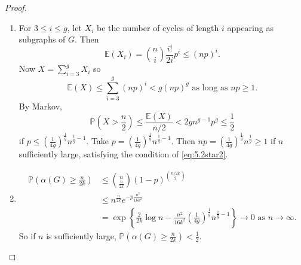 \documentclass{article}
\begin{document}
\begin{proof}
    \begin{enumerate}
        \item For $3 \leq i \leq g$, let $X_i$ be the number of cycles of length $i$ appearing as subgraphs of $G$.
            Then
            \begin{equation*}
                \mathbb{E}(X_i) = \binom{n}{i} \frac{i!}{2i} p^i \leq (np)^i.
            \end{equation*}
            Now $X = \sum_{i=3}^g X_i$ so
            \begin{equation*}
                \mathbb{E}(X) \leq \sum_{i=3}^g (np)^i < g (np)^g \text{ as long as } np \geq 1. \label{eq:5.2star2}\tag{$*$}
            \end{equation*}
            By Markov,
            \begin{equation*}
                \mathbb{P}\left(X > \frac{n}{2}\right) \leq \frac{\mathbb{E}(X)}{n/2} < 2g n^{g-1} p^g \leq \frac{1}{2}
            \end{equation*}
            if $p \leq (\frac{1}{4g})^{\frac{1}{g}} n^{\frac{1}{g}-1}$.
            Take $p = (\frac{1}{4g})^{\frac{1}{g}} n^{\frac{1}{g}-1}$.
            Then $np = \left(\frac{1}{4g}\right)^\frac{1}{g} n^{\frac{1}{g}} \geq 1$ if $n$ sufficiently large, satisfying the condition of \eqref{eq:5.2star2}.
        \item \begin{align*}
                \mathbb{P}\left(\alpha(G) \geq \frac{n}{2k}\right) &\leq \binom{n}{\frac{n}{2k}} (1-p)^{\binom{n/2k}{2}} \\
                                                        &\leq n^{\frac{n}{2k}} e^{-p\frac{n^2}{16k^2}} \\
                                                        &= \exp\left\{\frac{2}{2k} \log n - \frac{n^2}{16k^2} \left(\frac{1}{4g}\right)^{\frac{1}{g}} n^{\frac{1}{g}-1}\right\} \to 0 \text{ as } n \to \infty.
            \end{align*}
            So if $n$ is sufficiently large, $\mathbb{P}(\alpha(G) \geq \frac{n}{2k}) < \frac{1}{2}$. \qedhere
    \end{enumerate}
\end{proof}

{
}
\end{document}
